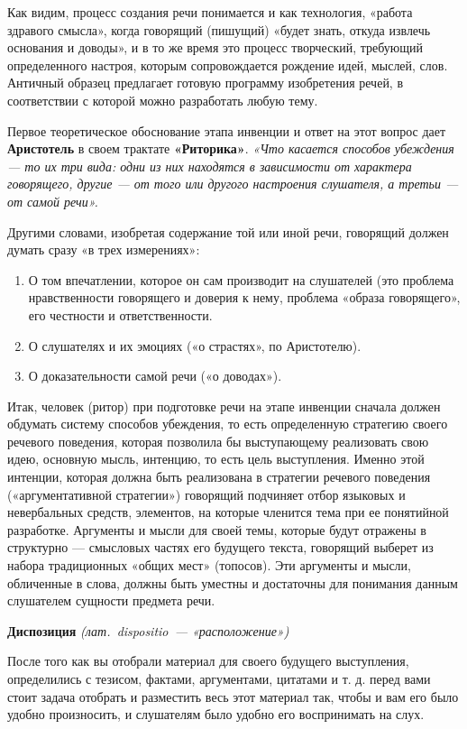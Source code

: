 Как видим, процесс создания речи понимается и как технология, «работа здравого смысла», когда говорящий (пишущий) «будет знать, откуда извлечь основания и доводы», и в то же время это процесс творческий, требующий определенного настроя, которым сопровождается рождение идей, мыслей, слов. Античный образец предлагает готовую программу изобретения речей, в соответствии с которой можно разработать любую тему.

Первое теоретическое обоснование этапа инвенции и ответ на этот вопрос дает \textbf{Аристотель} в своем трактате \textbf{«Риторика»}. \textit{«Что касается способов убеждения — то их три вида: одни из них находятся в зависимости от характера говорящего, другие — от того или другого настроения слушателя, а третьи — от самой речи».}

Другими словами, изобретая содержание той или иной речи, говорящий должен думать сразу «в трех измерениях»:
\begin{enumerate}
    \item О том впечатлении, которое он сам производит на слушателей (это проблема нравственности говорящего и доверия к нему, проблема «образа говорящего», его честности и ответственности.
    \item О слушателях и их эмоциях («о страстях», по Аристотелю).
    \item  О доказательности самой речи («о доводах»).
\end{enumerate}

Итак, человек (ритор) при подготовке речи на этапе инвенции сначала должен обдумать систему способов убеждения, то есть определенную стратегию своего речевого поведения, которая позволила бы выступающему реализовать свою идею, основную мысль, интенцию, то есть цель выступления.
Именно этой интенции, которая должна быть реализована в стратегии речевого поведения («аргументативной стратегии») говорящий подчиняет отбор языковых и невербальных средств, элементов, на которые членится тема при ее понятийной разработке. Аргументы и мысли для своей темы, которые будут отражены в структурно — смысловых частях его будущего текста, говорящий выберет из набора традиционных «общих мест» (топосов). Эти аргументы и мысли, обличенные в слова, должны быть уместны и достаточны для понимания данным слушателем сущности предмета речи.

\textbf{Диспозиция} \textit{(лат. dispositio — «расположение»)}

 После того как вы отобрали материал для своего будущего выступления, определились с тезисом, фактами, аргументами, цитатами и т. д. перед вами стоит задача отобрать и разместить весь этот материал так, чтобы и вам его было удобно произносить, и слушателям было удобно его воспринимать на слух.
 
